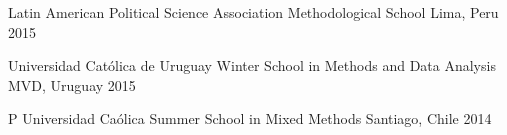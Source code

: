 \vspace{1mm}

\begin{cvhonors}
\cvconf
{Latin American Political Science Association Methodological School}
{Lima, Peru}
{2015}
\end{cvhonors}

\vspace{1mm}

\begin{cvhonors}
\cvconf
{Universidad Cat\'olica de Uruguay Winter School in Methods and Data Analysis}
{MVD, Uruguay}
{2015}
\end{cvhonors}

\vspace{1mm}

\begin{cvhonors}
\cvconf
{P Universidad Ca\'olica Summer School in Mixed Methods}
{Santiago, Chile}
{2014}
\end{cvhonors}

\vspace{1mm}
